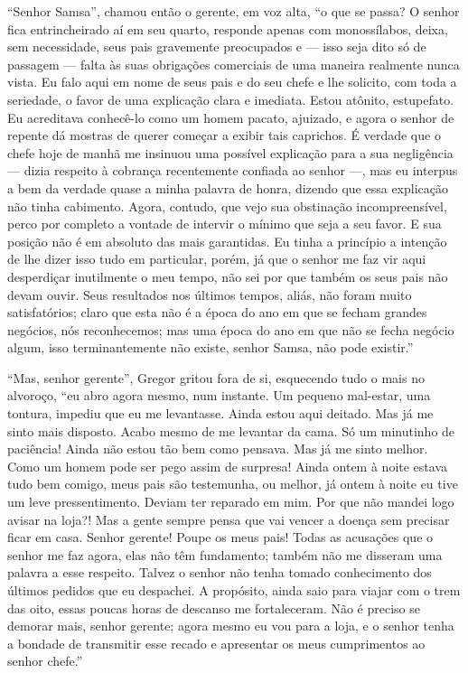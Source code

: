 “Senhor Samsa”, chamou então o gerente, em voz alta, “o que se passa? O
senhor fica entrincheirado aí em seu quarto, responde apenas com
monossílabos, deixa, sem necessidade, seus pais gravemente preocupados e ---
isso seja dito só de passagem --- falta às suas obrigações comerciais de uma
maneira realmente nunca vista. Eu falo aqui em nome de seus pais e do seu
chefe e lhe solicito, com toda a seriedade, o favor de uma explicação
clara e imediata. Estou atônito, estupefato. Eu acreditava conhecê-lo como
um homem pacato, ajuizado, e agora o senhor de repente dá mostras de
querer começar a exibir tais caprichos. É verdade que o chefe hoje de
manhã me insinuou uma possível explicação para a sua negligência --- dizia
respeito à cobrança recentemente confiada ao senhor ---, mas eu interpus a
bem da verdade quase a minha palavra de honra, dizendo que essa explicação
não tinha cabimento. Agora, contudo, que vejo sua obstinação
incompreensível, perco por completo a vontade de intervir o mínimo que
seja a seu favor. E sua posição não é em absoluto das mais garantidas. Eu
tinha a princípio a intenção de lhe dizer isso tudo em particular, porém,
já que o senhor me faz vir aqui desperdiçar inutilmente o meu tempo, não
sei por que também os seus pais não devam ouvir. Seus resultados nos
últimos tempos, aliás, não foram muito satisfatórios; claro que esta não é
a época do ano em que se fecham grandes negócios, nós reconhecemos; mas
uma época do ano em que não se fecha negócio algum, isso terminantemente
não existe, senhor Samsa, não pode existir.”

“Mas, senhor gerente”, Gregor gritou fora de si, esquecendo tudo o mais no
alvoroço, “eu abro agora mesmo, num instante. Um pequeno mal-estar, uma
tontura, impediu que eu me levantasse. Ainda estou aqui deitado. Mas já me
sinto mais disposto. Acabo mesmo de me levantar da cama. Só um minutinho
de paciência! Ainda não estou tão bem como pensava. Mas já me sinto
melhor. Como um homem pode ser pego assim de surpresa! Ainda ontem à noite
estava tudo bem comigo, meus pais são testemunha, ou melhor, já ontem à
noite eu tive um leve pressentimento. Deviam ter reparado em mim. Por que
não mandei logo avisar na loja?! Mas a gente sempre pensa que vai vencer a
doença sem precisar ficar em casa. Senhor gerente! Poupe os meus pais!
Todas as acusações que o senhor me faz agora, elas não têm fundamento;
também não me disseram uma palavra a esse respeito. Talvez o senhor não
tenha tomado conhecimento dos últimos pedidos que eu despachei. A
propósito, ainda saio para viajar com o trem das oito, essas poucas horas
de descanso me fortaleceram. Não é preciso se demorar mais, senhor
gerente; agora mesmo eu vou para a loja, e o senhor tenha a bondade de
transmitir esse recado e apresentar os meus cumprimentos ao senhor chefe.”


